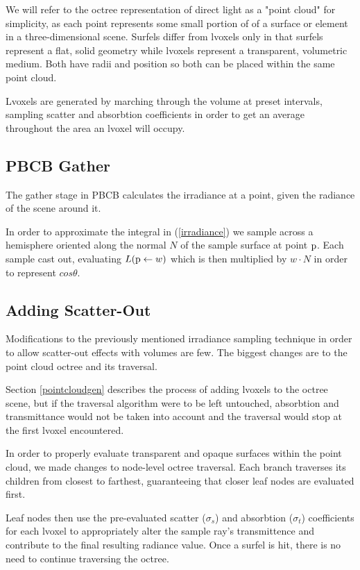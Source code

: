 \documentclass[runningheads]{llncs}
\begin{document}
We will refer to the octree representation of direct light as a "point cloud" for simplicity, as each point represents some small portion of of a surface or element in a three-dimensional scene.  Surfels differ from lvoxels only in that surfels represent a flat, solid geometry while lvoxels represent a transparent, volumetric medium.  Both have radii and position so both can be placed within the same point cloud.

Lvoxels are generated by marching through the volume at preset intervals, sampling scatter and absorbtion coefficients in order to get an average throughout the area an lvoxel will occupy. 

\subsection{PBCB Gather}
The gather stage in PBCB calculates the irradiance at a point, given the radiance of the scene around it.  

In order to approximate the integral in (\ref{irradiance}) we sample across a hemisphere oriented along the normal $N$ of the sample surface at point $\textup{p}$.  Each sample cast out, evaluating $L(\textup{p} \leftarrow w)$ which is then multiplied by $w \cdot N$ in order to represent $cos\theta$.


\subsection{Adding Scatter-Out}
\label{scatterout_sec}
Modifications to the previously mentioned irradiance sampling technique in order to allow scatter-out effects with volumes are few.  The biggest changes are to the point cloud octree and its traversal.

Section \ref{pointcloudgen} describes the process of adding lvoxels to the octree scene, but if the traversal algorithm were to be left untouched, absorbtion and transmittance would not be taken into account and the traversal would stop at the first lvoxel encountered.

In order to properly evaluate transparent and opaque surfaces within the point cloud, we made changes to node-level octree traversal.  Each branch traverses its children from closest to farthest, guaranteeing that closer leaf nodes are evaluated first.

Leaf nodes then use the pre-evaluated scatter ($\sigma_{s}$) and absorbtion ($\sigma_{t}$) coefficients for each lvoxel to appropriately alter the sample ray's transmittence and contribute to the final resulting radiance value.  Once a surfel is hit, there is no need to continue traversing the octree.
\end{document}
